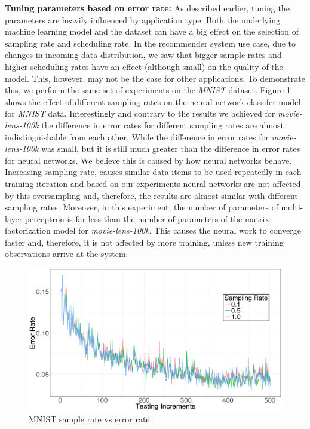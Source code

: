 \documentclass{vldb}
\begin{document}
\textbf{Tuning parameters based on error rate:} As described earlier, tuning the parameters are heavily influenced by application type.
Both the underlying machine learning model and the dataset can have a big effect on the selection of sampling rate and scheduling rate.
In the recommender system use case, due to changes in incoming data distribution, we saw that bigger sample rates and higher scheduling rates have an effect (although small) on the quality of the model.
This, however, may not be the case for other applications.
To demonstrate this, we perform the same set of experiments on the \textit{MNIST} dataset.
Figure \ref{fig:mnist-sample-rate} shows the effect of different sampling rates on the neural network classifer model for \textit{MNIST} data.
Interestingly and contrary to the results we achieved for \textit{movie-lens-100k} the difference in error rates for different sampling rates are almost indistinguishable from each other.
While the difference in error rates for \textit{movie-lens-100k} was small, but it is still much greater than the difference in error rates for neural networks.
We believe this is caused by how neural networks behave.
Increasing sampling rate, causes similar data items to be used repeatedly in each training iteration and based on our experiments neural networks are not affected by this oversampling and, therefore, the results are almost similar with different sampling rates.
Moreover, in this experiment, the number of parameters of multi-layer perceptron is far less than the number of parameters of the matrix factorization model for \textit{movie-lens-100k}.
This causes the neural work to converge faster and, therefore, it is not affected by more training, unless new training observations arrive at the system.

\begin{figure}[!ht]
\centering
\includegraphics[width=\columnwidth]{../images/experiment-results/mnist-sampling-improved.eps}
\caption{MNIST sample rate vs error rate}
\label{fig:mnist-sample-rate}
\end{figure}
\end{document}
